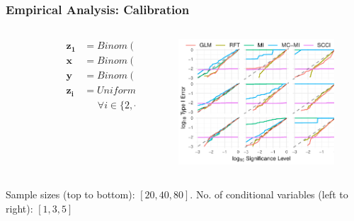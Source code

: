 \documentclass{beamer}
\begin{document}
\begin{frame}
	\frametitle{Empirical Analysis: Calibration}
	\begin{columns}
		\begin{column}{0.2\textwidth}
			\begin{figure}
				\begin{subfigure}{\linewidth}
					\centering
				\end{subfigure}
				\begin{subfigure}{\linewidth}
					\centering
					\begin{equation*}
						\begin{split}
							\bm{z_1} &= Binom(1, 0.5) \\
							\bm{x} &= Binom(1, \bm{z_1} / 3) \\
							\bm{y} &= Binom(1, \bm{z_1} / 3) \\
							\bm{z_i} &= Uniform([0, 1]) \\
								 & \;\;\;\;\; \forall i \in \{ 2, \cdots, k \} \\
						\end{split}
					\end{equation*}
				\end{subfigure}
			\end{figure}
		\end{column}
		\begin{column}{0.8\textwidth}
			\begin{figure}	
				\includegraphics{imgs/calibration_add_vars.pdf}
			\end{figure}
		\end{column}
	\end{columns}
	\begin{center}
	Sample sizes (top to bottom): $ [20, 40, 80] $. No. of conditional variables (left to right): $ [1, 3, 5] $
	\end{center}
\end{frame}
\end{document}
